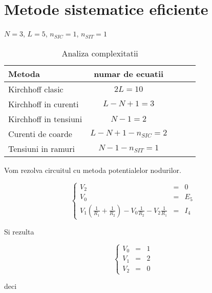 \newpage
\section{Metode sistematice eficiente}

$N = 3$, $L = 5$, $n_{SIC} = 1$, $n_{SIT} = 1$
\begin{table}[ht]  %
\centering
\caption{Analiza complexitatii}
\label{tab:exemplu_tabel}       %

\begin{tabular}{|p{5cm}||c|l|r|p{4cm}|}  \hline  %
Metoda & numar de ecuatii  \\ \hline \hline
Kirchhoff clasic & $2L = 10$\\\hline
Kirchhoff in curenti & $L - N + 1 = 3$\\\hline
Kirchhoff in tensiuni  & $N - 1 = 2$\\  \hline
Curenti de coarde & $L - N + 1 - n_{SIC} = 2$\\\hline
Tensiuni in ramuri & $N - 1 - n_{SIT} = 1$\\\hline
\end{tabular}
\end{table}

Vom rezolva circuitul cu metoda potentialelor nodurilor.

\begin{equation}
\left\{
\begin{array}{ccl} %
V_2 & = & 0 \\
V_0 & = & E_5 \\
V_1(\frac{1}{R_1} + \frac{1}{R_2}) - V_0\frac{1}{R_2} - V_2\frac{1}{R_1} & = & I_4
\end{array}  
\right. \nonumber %
\end{equation}

Si rezulta

\begin{equation}
\left\{
\begin{array}{ccl} %
V_0 & = & 1 \\
V_1 & = & 2 \\
V_2 & = & 0
\end{array}  
\right. \nonumber %
\end{equation}

deci

